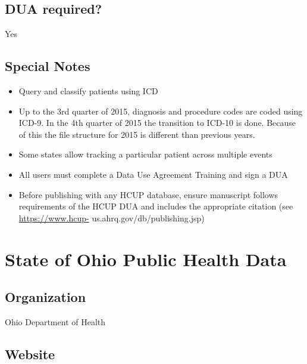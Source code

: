 \documentclass[
]{book}
\providecommand{\tightlist}{%
  \setlength{\itemsep}{0pt}\setlength{\parskip}{0pt}}
\begin{document}
\hypertarget{dua-required-85}{%
\section{DUA required?}\label{dua-required-85}}

Yes

\hypertarget{special-notes-85}{%
\section{Special Notes}\label{special-notes-85}}

\begin{itemize}
\tightlist
\item
  Query and classify patients using ICD
\item
  Up to the 3rd quarter of 2015, diagnosis and procedure codes are coded using ICD-9. In the 4th quarter of 2015 the transition to ICD-10 is done. Because of this the file structure for 2015 is different than previous years.
\item
  Some states allow tracking a particular patient across multiple events
\item
  All users must complete a Data Use Agreement Training and sign a DUA
\item
  Before publishing with any HCUP database, ensure manuscript follows requirements of the HCUP DUA and includes the appropriate citation (see \url{https://www.hcup-} us.ahrq.gov/db/publishing.jsp)
\end{itemize}

\mainmatter

\hypertarget{state-of-ohio-public-health-data}{%
\chapter{State of Ohio Public Health Data}\label{state-of-ohio-public-health-data}}

\hypertarget{organization-86}{%
\section{Organization}\label{organization-86}}

Ohio Department of Health

\hypertarget{website-86}{%
\section{Website}\label{website-86}}
\end{document}
